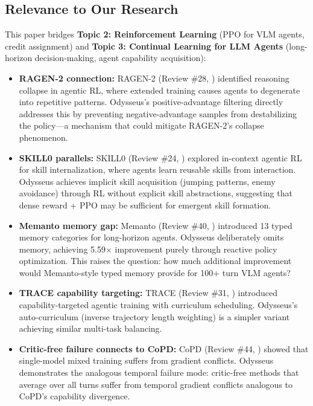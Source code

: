 \documentclass[11pt]{article}
\begin{document}
\subsection{Relevance to Our Research}

This paper bridges \textbf{Topic 2: Reinforcement Learning} (PPO for VLM agents, credit assignment) and \textbf{Topic 3: Continual Learning for LLM Agents} (long-horizon decision-making, agent capability acquisition):

\begin{itemize}
    \item \textbf{RAGEN-2 connection:} RAGEN-2 (Review \#28, \cite{ragen2}) identified reasoning collapse in agentic RL, where extended training causes agents to degenerate into repetitive patterns. Odysseus's positive-advantage filtering directly addresses this by preventing negative-advantage samples from destabilizing the policy---a mechanism that could mitigate RAGEN-2's collapse phenomenon.
    \item \textbf{SKILL0 parallels:} SKILL0 (Review \#24, \cite{skill0}) explored in-context agentic RL for skill internalization, where agents learn reusable skills from interaction. Odysseus achieves implicit skill acquisition (jumping patterns, enemy avoidance) through RL without explicit skill abstractions, suggesting that dense reward + PPO may be sufficient for emergent skill formation.
    \item \textbf{Memanto memory gap:} Memanto (Review \#40, \cite{memanto}) introduced 13 typed memory categories for long-horizon agents. Odysseus deliberately omits memory, achieving 5.59$\times$ improvement purely through reactive policy optimization. This raises the question: how much additional improvement would Memanto-style typed memory provide for 100+ turn VLM agents?
    \item \textbf{TRACE capability targeting:} TRACE (Review \#31, \cite{trace}) introduced capability-targeted agentic training with curriculum scheduling. Odysseus's auto-curriculum (inverse trajectory length weighting) is a simpler variant achieving similar multi-task balancing.
    \item \textbf{Critic-free failure connects to CoPD:} CoPD (Review \#44, \cite{copd}) showed that single-model mixed training suffers from gradient conflicts. Odysseus demonstrates the analogous temporal failure mode: critic-free methods that average over all turns suffer from temporal gradient conflicts analogous to CoPD's capability divergence.
\end{itemize}
\end{document}
